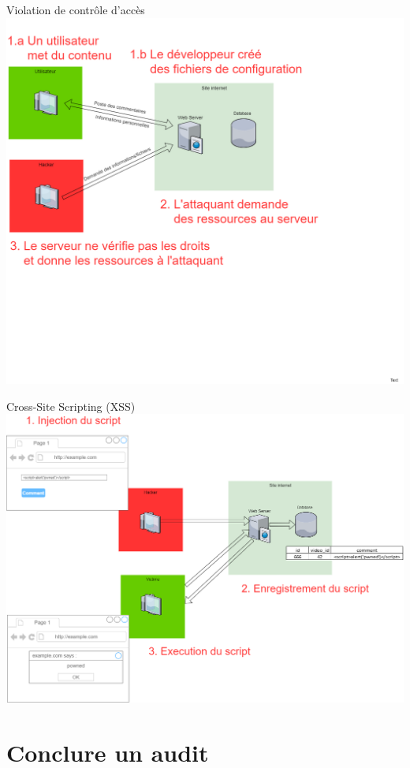 \documentclass{beamer}
\begin{document}
\begin{frame}{Violation de contrôle d’accès}
\centering
\includegraphics[width=\paperwidth ]{schemas/images/broken_ac.png}
\end{frame}
\begin{frame}{Cross-Site Scripting (XSS)}
\centering
\includegraphics[width=0.92\paperwidth ]{schemas/images/XSS.png}
\end{frame}

\section{Conclure un audit}	
\end{document}
